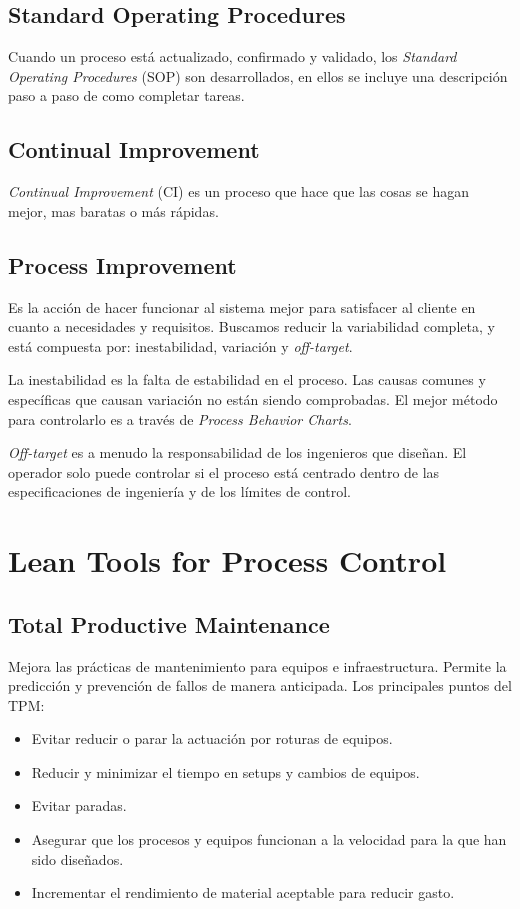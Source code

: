 \documentclass[]{article}
\begin{document}
\subsection{Standard Operating Procedures}

Cuando un proceso está actualizado, confirmado y validado, los \textit{Standard Operating Procedures} (SOP) son desarrollados, en ellos se incluye una descripción paso a paso de como completar tareas. 

\subsection{Continual Improvement}

\textit{Continual Improvement} (CI) es un proceso que hace que las cosas se hagan mejor, mas baratas o más rápidas. 

\subsection{Process Improvement}

Es la acción de hacer funcionar al sistema mejor para satisfacer al cliente en cuanto a necesidades y requisitos. Buscamos reducir la variabilidad completa, y está compuesta por: inestabilidad, variación y \textit{off-target}.

La inestabilidad es la falta de estabilidad en el proceso. Las causas comunes y específicas que causan variación no están siendo comprobadas. El mejor método para controlarlo es a través de \textit{Process Behavior Charts}.

\textit{Off-target} es a menudo la responsabilidad de los ingenieros que diseñan. El operador solo puede controlar si el proceso está centrado dentro de las especificaciones de ingeniería y de los límites de control.

\section{Lean Tools for Process Control}

\subsection{Total Productive Maintenance}

Mejora las prácticas de mantenimiento para equipos e infraestructura. Permite la predicción y prevención de fallos de manera anticipada. Los principales puntos del TPM:
\begin{itemize}
	\item Evitar reducir o parar la actuación por roturas de equipos.
	\item Reducir y minimizar el tiempo en setups y cambios de equipos.
	\item Evitar paradas.
	\item Asegurar que los procesos y equipos funcionan a la velocidad para la que han sido diseñados.
	\item Incrementar el rendimiento de material aceptable para reducir gasto.
\end{itemize}
\end{document}
